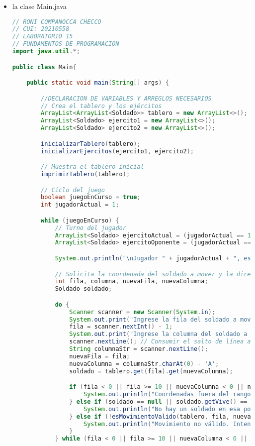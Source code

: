 \documentclass{article}
\begin{document}
\begin{itemize}
\begin{itemize}
        \item la clase Main.java
        
        \begin{lstlisting}[language=java]
// RONI COMPANOCCA CHECCO
// CUI: 20210558
// LABORATORIO 15
// FUNDAMENTOS DE PROGRAMACION 
import java.util.*;

public class Main{

	public static void main(String[] args) {

		//DECLARACION DE VARIABLES Y ARREGLOS NECESARIOS
		// Crea el tablero y los ejércitos
        ArrayList<ArrayList<Soldado>> tablero = new ArrayList<>();
        ArrayList<Soldado> ejercito1 = new ArrayList<>();
        ArrayList<Soldado> ejercito2 = new ArrayList<>();

        inicializarTablero(tablero);
        inicializarEjercitos(ejercito1, ejercito2);

        // Muestra el tablero inicial
        imprimirTablero(tablero);

        // Ciclo del juego
        boolean juegoEnCurso = true;
        int jugadorActual = 1;

        while (juegoEnCurso) {
            // Turno del jugador
            ArrayList<Soldado> ejercitoActual = (jugadorActual == 1) ? ejercito1 : ejercito2;
            ArrayList<Soldado> ejercitoOponente = (jugadorActual == 1) ? ejercito2 : ejercito1;

            System.out.println("\nJugador " + jugadorActual + ", es tu turno:");

            // Solicita la coordenada del soldado a mover y la dirección
            int fila, columna, nuevaFila, nuevaColumna;
            Soldado soldado;

            do {
                Scanner scanner = new Scanner(System.in);
                System.out.print("Ingrese la fila del soldado a mover (1-10): ");
                fila = scanner.nextInt() - 1;
                System.out.print("Ingrese la columna del soldado a mover (A-J): ");
                scanner.nextLine(); // Consumir el salto de línea anterior
                String columnaStr = scanner.nextLine();
                nuevaFila = fila;
                nuevaColumna = columnaStr.charAt(0) - 'A';
                soldado = tablero.get(fila).get(nuevaColumna);

                if (fila < 0 || fila >= 10 || nuevaColumna < 0 || nuevaColumna >= 10) {
                    System.out.println("Coordenadas fuera del rango. Intente de nuevo.");
                } else if (soldado == null || soldado.getVive() == false) {
                    System.out.println("No hay un soldado en esa posición o está muerto. Intente de nuevo.");
                } else if (!esMovimientoValido(tablero, fila, nuevaColumna, nuevaFila, nuevaColumna)) {
                    System.out.println("Movimiento no válido. Intente de nuevo.");
                }
            } while (fila < 0 || fila >= 10 || nuevaColumna < 0 || nuevaColumna >= 10 || soldado == null || soldado.getVive() == false || !esMovimientoValido(tablero, fila, nuevaColumna, nuevaFila, nuevaColumna));


\end{lstlisting}
\end{itemize}
\end{itemize}
\end{document}
